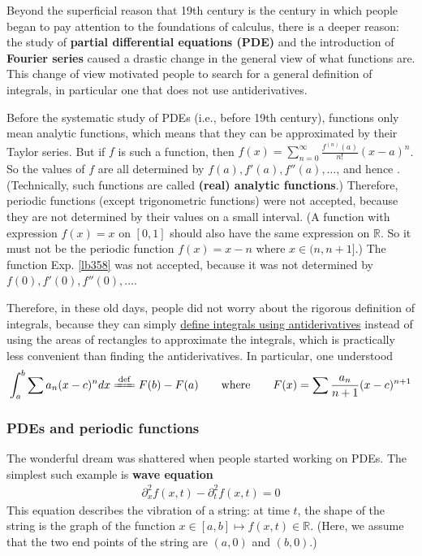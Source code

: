 \documentclass[12pt,b5paper,notitlepage]{article}
\theoremstyle{definition}
\theoremstyle{plain}
\newcommand{\Rbb}{\mathbb R}
\numberwithin{equation}{section}
\begin{document}
Beyond the superficial reason that 19th century is the century in which people began to pay attention to the foundations of calculus, there is a deeper reason: the study of \textbf{partial differential equations (PDE)} and the introduction of \textbf{Fourier series} caused a drastic change in the general view of what functions are. This change of view motivated people to search for a general definition of integrals, in particular one that does not use antiderivatives.

Before the systematic study of PDEs (i.e., before 19th century), functions only mean analytic functions, which means that they can be approximated by their Taylor series. But if $f$ is such a function, then $f(x)=\sum_{n=0}^\infty \frac{f^{(n)}(a)}{n!}(x-a)^n$. So the values of $f$ are all determined by $f(a),f'(a),f''(a),\dots$, and hence . (Technically, such functions are called \textbf{(real) analytic functions}.) Therefore, periodic functions (except trigonometric functions) were not accepted, because they are not determined by their values on a small interval. (A function with expression $f(x)=x$ on $[0,1]$ should also have the same expression on $\Rbb$. So it must not be the periodic function $f(x)=x-n$ where $x\in(n,n+1]$.) The function Exp. \ref{lb358} was not accepted, because it was not determined by $f(0),f'(0),f''(0),\dots$.

Therefore, in these old days, people did not worry about the rigorous definition of integrals, because they can simply \uline{define integrals using antiderivatives} instead of using the areas of rectangles to approximate the integrals, which is practically less convenient than finding the antiderivatives. In particular, one understood
\begin{align*}
\int_a^b \sum a_n (x-c)^ndx\xlongequal{\mathrm{def}}F(b)-F(a)\qquad\text{where}\qquad F(x)=\sum \frac{a_n}{n+1}(x-c)^{n+1}
\end{align*}

\subsubsection{PDEs and periodic functions}

The wonderful dream was shattered when people started working on PDEs. The simplest such example is \textbf{wave equation}
\begin{align}
\partial_x^2f(x,t)-\partial_t^2f(x,t)=0
\end{align} 
This equation describes the vibration of a string: at time $t$, the shape of the string is the graph of the function $x\in[a,b]\mapsto f(x,t)\in\Rbb$. (Here, we assume that the two end points of the string are $(a,0)$ and $(b,0)$.)
\end{document}

